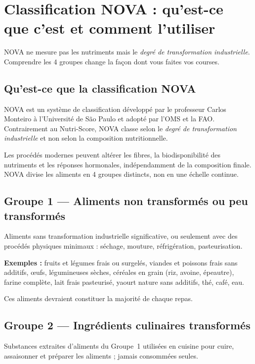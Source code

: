 \documentclass[a5paper,12pt,oneside,openany]{book}
\newcommand{\boxvert}[2]{%
  \begin{tcolorbox}[boitebase,
    colback=verdescuro!8!white, colframe=verdescuro, title={#1}]
  #2\end{tcolorbox}}
\begin{document}
\chapter{Classification NOVA : qu'est-ce que c'est et comment l'utiliser}

NOVA ne mesure pas les nutriments mais le \emph{degré de transformation
industrielle}. Comprendre les 4 groupes change la façon dont vous faites
vos courses.

\section{Qu'est-ce que la classification NOVA}

NOVA est un système de classification développé par le professeur Carlos Monteiro
à l'Université de São Paulo et adopté par l'OMS et la FAO. Contrairement au
Nutri-Score, NOVA classe selon le \emph{degré de transformation industrielle}
et non selon la composition nutritionnelle.

Les procédés modernes peuvent altérer les fibres, la biodisponibilité des
nutriments et les réponses hormonales, indépendamment de la composition finale.
NOVA divise les aliments en 4 groupes distincts, non en une échelle continue.

\section{Groupe 1 --- Aliments non transformés ou peu transformés}

Aliments sans transformation industrielle significative, ou seulement avec des
procédés physiques minimaux : séchage, mouture, réfrigération, pasteurisation.

\textbf{Exemples :} fruits et légumes frais ou surgelés, viandes et poissons
frais sans additifs, œufs, légumineuses sèches, céréales en grain (riz, avoine,
épeautre), farine complète, lait frais pasteurisé, yaourt nature sans additifs,
thé, café, eau.

\boxvert{Objectif}{Ces aliments devraient constituer la majorité de chaque repas.}

\section{Groupe 2 --- Ingrédients culinaires transformés}

Substances extraites d'aliments du Groupe~1 utilisées en cuisine pour cuire,
assaisonner et préparer les aliments ; jamais consommées seules.
\end{document}
